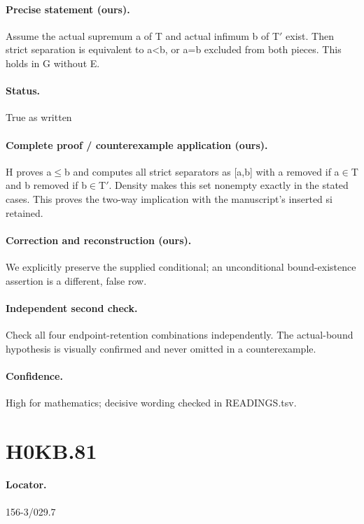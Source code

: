 \paragraph{Precise statement (ours).} Assume the actual supremum a of T and actual infimum b of T\ensuremath{\prime} exist. Then strict separation is equivalent to a<b, or a=b excluded from both pieces. This holds in G without E.

\paragraph{Status.} True as written

\paragraph{Complete proof / counterexample application (ours).} H proves a\ensuremath{\leq}b and computes all strict separators as [a,b] with a removed if a\ensuremath{\in}T and b removed if b\ensuremath{\in}T\ensuremath{\prime}. Density makes this set nonempty exactly in the stated cases. This proves the two-way implication with the manuscript’s inserted si retained.

\paragraph{Correction and reconstruction (ours).} We explicitly preserve the supplied conditional; an unconditional bound-existence assertion is a different, false row.

\paragraph{Independent second check.} Check all four endpoint-retention combinations independently. The actual-bound hypothesis is visually confirmed and never omitted in a counterexample.

\paragraph{Confidence.} High for mathematics; decisive wording checked in READINGS.tsv.

\section*{H0KB.81}\label{statement:H0KB.81}
\paragraph{Locator.} 156-3/029.7

